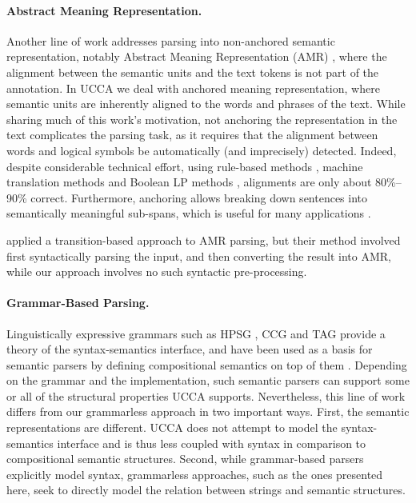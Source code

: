 \documentclass[11pt]{article}
\begin{document}
\paragraph{Abstract Meaning Representation.}
Another line of work addresses parsing into non-anchored
semantic representation, notably Abstract Meaning Representation (AMR)
\cite{flanigan2014discriminative,vanderwende2015amr,pust2015parsing,artzi2015broad},
where the alignment between the semantic units and the text tokens is not part of the annotation.
In UCCA we deal with anchored meaning representation,
where semantic units are inherently aligned to the words and phrases of the text.
While sharing much of this work's motivation,
not anchoring the representation in the text
complicates the parsing task, as it requires
that the alignment between words and logical symbols be automatically
(and imprecisely) detected. Indeed, despite considerable technical effort,
using rule-based methods \cite{flanigan2014discriminative}, machine translation methods \cite{pourdamghani2014aligning} and Boolean LP methods \cite{werling2015robust}, alignments are only about 80\%--90\% correct.
Furthermore, anchoring allows breaking down sentences into semantically meaningful sub-spans,
which is useful for many applications \cite{fernandez2015parsing,birch2016hume}.

applied a transition-based approach to AMR parsing,
but their method involved first syntactically parsing the input, and then converting
the result into AMR, while our approach involves no such syntactic pre-processing.

\paragraph{Grammar-Based Parsing.}
Linguistically expressive grammars such as HPSG \cite{PandS:94}, CCG \cite{Steedman:00} and TAG \cite{Joshi:97}
provide a theory of the syntax-semantics interface, and have been used as a basis for semantic parsers
by defining compositional semantics on top of them \cite[among others]{Flic:00,bos2005towards}.
Depending on the grammar and the implementation, such semantic parsers can support
some or all of the structural properties UCCA supports.
Nevertheless, this line of work differs from our grammarless approach in two important ways.
First, the semantic representations are different. UCCA does not attempt to model
the syntax-semantics interface and is thus less coupled with syntax in comparison to
compositional semantic structures.
Second, while grammar-based parsers explicitly model syntax, grammarless
approaches, such as the ones presented here, seek to directly model the relation between
strings and semantic structures.
\end{document}

